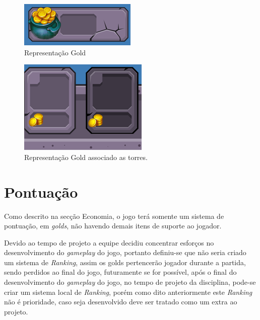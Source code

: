 \documentclass[11pt]{article} %
\begin{document}
\begin{figure}[!htp]
\centering
\includegraphics[scale=1.25]{res/gold.png}
\caption{Representação Gold}
\label{Tela Equip}
\end{figure}

\begin{figure}[!htp]
\centering
\includegraphics[scale=1.0]{res/torresGold.png}
\caption{Representação Gold associado as torres.}
\label{Tela Equip}
\end{figure}

\newpage

\section{Pontuação}
Como descrito na secção Economia, o jogo terá somente um sistema de pontuação, em \textit{golds}, não havendo demais itens de suporte ao jogador.

Devido ao tempo de projeto a equipe decidiu concentrar esforços no desenvolvimento do \textit{gameplay} do jogo, portanto definiu-se que não seria criado um sistema de \textit{Ranking}, assim os golds pertencerão jogador durante a partida, sendo perdidos ao final do jogo, futuramente se for possível, após o final do desenvolvimento do \textit{gameplay} do jogo, no tempo de projeto da disciplina, pode-se criar um sistema local de \textit{Ranking}, porém como dito anteriormente este \textit{Ranking} não é prioridade, caso seja desenvolvido deve ser tratado como um extra ao projeto.  
\end{document}
